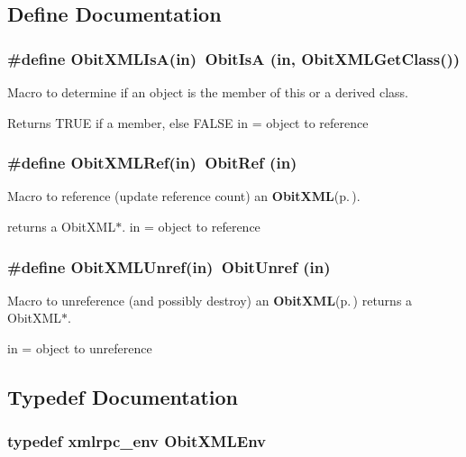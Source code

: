 \subsection{Define Documentation}
\subsubsection{\setlength{\rightskip}{0pt plus 5cm}\#define Obit\-XMLIs\-A(in)\ Obit\-Is\-A (in, Obit\-XMLGet\-Class())}\label{ObitXML_8h_a2}


Macro to determine if an object is the member of this or a derived class. 

Returns TRUE if a member, else FALSE in = object to reference 
\subsubsection{\setlength{\rightskip}{0pt plus 5cm}\#define Obit\-XMLRef(in)\ Obit\-Ref (in)}\label{ObitXML_8h_a1}


Macro to reference (update reference count) an {\bf Obit\-XML}{\rm (p.\,\pageref{structObitXML})}. 

returns a Obit\-XML$\ast$. in = object to reference 
\subsubsection{\setlength{\rightskip}{0pt plus 5cm}\#define Obit\-XMLUnref(in)\ Obit\-Unref (in)}\label{ObitXML_8h_a0}


Macro to unreference (and possibly destroy) an {\bf Obit\-XML}{\rm (p.\,\pageref{structObitXML})} returns a Obit\-XML$\ast$. 

in = object to unreference 

\subsection{Typedef Documentation}
\subsubsection{\setlength{\rightskip}{0pt plus 5cm}typedef xmlrpc\_\-env {\bf Obit\-XMLEnv}}\label{ObitXML_8h_a3}



